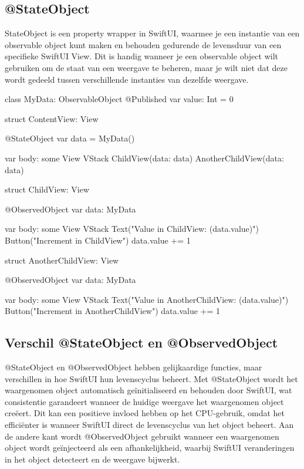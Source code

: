 \subsection{@StateObject}
StateObject is een property wrapper in SwiftUI, waarmee je een instantie van een observable object kunt maken en behouden gedurende de levensduur van een specifieke SwiftUI View. Dit is handig wanneer je een observable object wilt gebruiken om de staat van een weergave te beheren, maar je wilt niet dat deze wordt gedeeld tussen verschillende instanties van dezelfde weergave.

\begin{swift}[caption=Example of StateObject, label=stateobject_example]
class MyData: ObservableObject {
    @Published var value: Int = 0
}

struct ContentView: View {
    @StateObject var data = MyData()
    
    var body: some View {
        VStack {
            ChildView(data: data)
            AnotherChildView(data: data)
        }
    }
}

struct ChildView: View {
    @ObservedObject var data: MyData
    
    var body: some View {
        VStack {
            Text("Value in ChildView: (data.value)")
            Button("Increment in ChildView") {
                data.value += 1
            }
        }
    }
}
struct AnotherChildView: View {
    @ObservedObject var data: MyData
    
    var body: some View {
        VStack {
            Text("Value in AnotherChildView: (data.value)")
            Button("Increment in AnotherChildView") {
                data.value += 1
            }
        }
    }
}

\end{swift}

\subsection{Verschil @StateObject en @ObservedObject}
\autocite{MediumDifferenceStateObjObservedObj} @StateObject en @ObservedObject hebben gelijkaardige functies, maar verschillen in hoe SwiftUI hun levenscyclus beheert. Met @StateObject wordt het waargenomen object automatisch geïnitialiseerd en behouden door SwiftUI, wat consistentie garandeert wanneer de huidige weergave het waargenomen object creëert. Dit kan een positieve invloed hebben op het CPU-gebruik, omdat het efficiënter is wanneer SwiftUI direct de levenscyclus van het object beheert. Aan de andere kant wordt @ObservedObject gebruikt wanneer een waargenomen object wordt geïnjecteerd als een afhankelijkheid, waarbij SwiftUI veranderingen in het object detecteert en de weergave bijwerkt.

